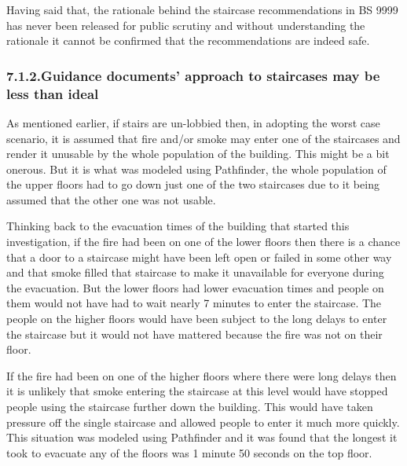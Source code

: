 \documentclass{style/llncs}
\begin{document}
Having said that, the rationale behind the staircase recommendations in BS 9999 has never been released for public scrutiny and without understanding the rationale it cannot be confirmed that the recommendations are indeed safe.%

\subsubsection{7.1.2.\hspace*{0.5em}Guidance documents’ approach to staircases may be less than ideal}\label{sec-guidance-documents-approach-to-staircases-may-be-less-than-ideal}%

\noindent{}As mentioned earlier, if stairs are un-lobbied then, in adopting the worst case scenario, it is assumed that fire and/or smoke may enter one of the staircases and render it unusable by the whole population of the building.  This might be a bit onerous.  But it is what was modeled using Pathfinder, the whole population of the upper floors had to go down just one of the two staircases due to it being assumed that the other one was not usable.%

Thinking back to the evacuation times of the building that started this investigation, if the fire had been on one of the lower floors then there is a chance that a door to a staircase might have been left open or failed in some other way and that smoke filled that staircase to make it unavailable for everyone during the evacuation.  But the lower floors had lower evacuation times and people on them would not have had to wait nearly 7 minutes to enter the staircase.  The people on the higher floors would have been subject to the long delays to enter the staircase but it would not have mattered because the fire was not on their floor.%

If the fire had been on one of the higher floors where there were long delays then it is unlikely that smoke entering the staircase at this level would have stopped people using the staircase further down the building.  This would have taken pressure off the single staircase and allowed people to enter it much more quickly.  This situation was modeled using Pathfinder and it was found that the longest it took to evacuate any of the floors was 1 minute 50 seconds on the top floor.%

\end{document}
